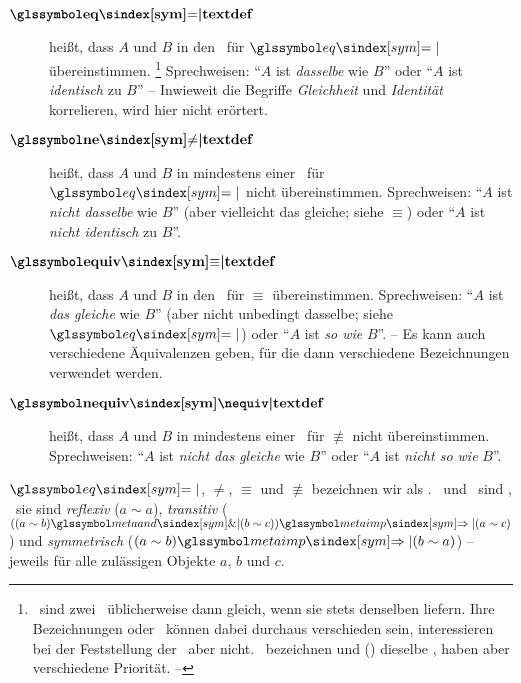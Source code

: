 \begin{description}
	\item[$\definition{\symeq}$]  \label{def:Gleichheit}
	 heißt, dass $A$ und $B$ in den \interessierendenEigenschaften\ für $\symeq$ übereinstimmen.%
	\footnote{%
		\textZB\ sind zwei \Junktoren\ üblicherweise dann gleich, wenn sie stets denselben \emph{\Wahrheitswert} liefern.
		Ihre Bezeichnungen oder \Symbole\ können dabei durchaus verschieden sein, interessieren bei der Feststellung der \Gleichheit\ aber nicht.
		\textZB\ bezeichnen \chrqt{\symmetaand} und \chrqt{\symsrand} () dieselbe \Operation, haben aber verschiedene Priorität. -- 
	}
	Sprechweisen: \enquote{$A$ ist \emph{dasselbe} wie $B$} oder \enquote{$A$ ist \emph{identisch} zu $B$}
	-- Inwieweit die Begriffe \emph{Gleichheit} und \emph{Identität} korrelieren, wird hier nicht erörtert.
	\item[$\definition{\symne}$]  \label{def:Ungleichheit}
	 heißt, dass $A$ und $B$ in mindestens einer \interessierendenEigenschaft\ für $\symeq$ nicht übereinstimmen.
	Sprechweisen: \enquote{$A$ ist \emph{nicht dasselbe} wie $B$} (aber vielleicht das gleiche; siehe $\equiv$) oder \enquote{$A$ ist \emph{nicht identisch} zu $B$}.
	\item[$\definition{\symequiv}$]  \label{def:Aequivalenz}
	 heißt, dass $A$ und $B$ in den \interessierendenEigenschaften\ für $\equiv$ übereinstimmen.
	Sprechweisen: \enquote{$A$ ist \emph{das gleiche} wie $B$} (aber nicht unbedingt dasselbe; siehe $\symeq$) oder \enquote{$A$ ist \emph{so wie} $B$}.
	-- Es kann auch verschiedene Äquivalenzen geben, für die dann verschiedene Bezeichnungen verwendet werden.
	\item[$\definition{\symnequiv}$]  \label{def:Kontravalenz}
	 heißt, dass $A$ und $B$ in mindestens einer \interessierendenEigenschaft\ für $\nequiv$ nicht übereinstimmen.
	Sprechweisen: \enquote{$A$ ist \emph{nicht das gleiche} wie $B$} oder \enquote{$A$ ist \emph{nicht so wie} $B$}.
\end{description}

$\symeq$, $\ne$, $\equiv$ und $\nequiv$ bezeichnen wir als  .
\Gleichheit\ und \Aequivalenz\ sind , \textdh\ sie sind \emph{reflexiv} ($a \sim a$), \emph{transitiv} ($((a \sim b) \symmetaand (b \sim c)) \symmetaimp (a \sim c)$) und \emph{symmetrisch} ($(a \sim b) \symmetaimp (b \sim a)$)
-- jeweils für alle zulässigen Objekte $a$, $b$ und $c$.

